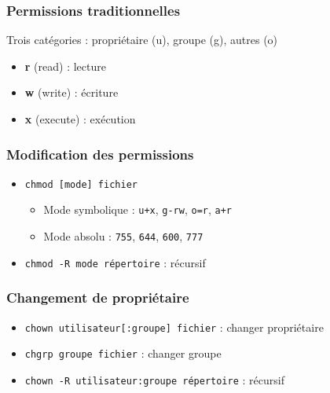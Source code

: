 \documentclass[12pt,a4paper]{article}
\begin{document}
\subsubsection{Permissions traditionnelles}
Trois cat\'egories : propri\'etaire (u), groupe (g), autres (o)
\begin{itemize}
    \item \textbf{r} (read) : lecture
    \item \textbf{w} (write) : \'ecriture
    \item \textbf{x} (execute) : ex\'ecution
\end{itemize}

\subsubsection{Modification des permissions}
\begin{itemize}
    \item \texttt{chmod [mode] fichier}
    \begin{itemize}
        \item Mode symbolique : \texttt{u+x}, \texttt{g-rw}, \texttt{o=r}, \texttt{a+r}
        \item Mode absolu : \texttt{755}, \texttt{644}, \texttt{600}, \texttt{777}
    \end{itemize}
    \item \texttt{chmod -R mode r\'epertoire} : r\'ecursif
\end{itemize}

\subsubsection{Changement de propri\'etaire}
\begin{itemize}
    \item \texttt{chown utilisateur[:groupe] fichier} : changer propri\'etaire
    \item \texttt{chgrp groupe fichier} : changer groupe
    \item \texttt{chown -R utilisateur:groupe r\'epertoire} : r\'ecursif
\end{itemize}

\end{document}
